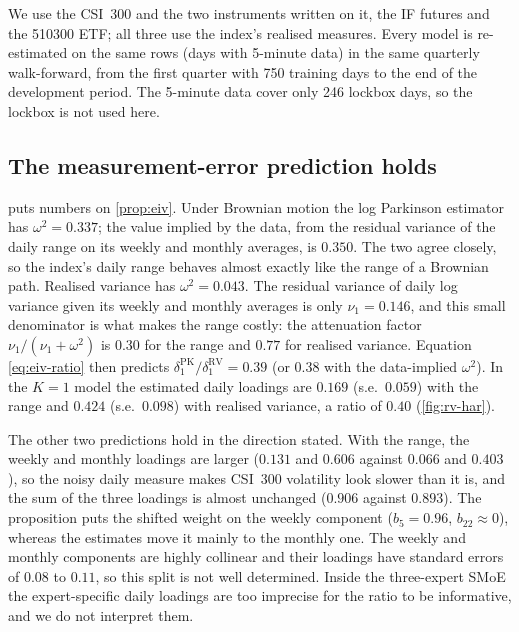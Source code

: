 We use the CSI~300 and the two instruments written on it, the IF futures and the 510300 ETF; all
three use the index's realised measures. Every model is re-estimated on the same rows (days with
5-minute data) in the same quarterly walk-forward, from the first quarter with 750 training days to
the end of the development period. The 5-minute data cover only 246 lockbox days, so the lockbox is
not used here.

\subsection{The measurement-error prediction holds}

 puts numbers on \cref{prop:eiv}. Under Brownian motion the log Parkinson
estimator has $\omega^2=0.337$; the value implied by the data, from the residual variance of the daily
range on its weekly and monthly averages, is $0.350$. The two agree closely, so the index's daily
range behaves almost exactly like the range of a Brownian path. Realised variance has
$\omega^2=0.043$. The residual variance of daily log variance given its weekly and monthly averages
is only $\nu_1=0.146$, and this small denominator is what makes the range costly: the attenuation
factor $\nu_1/(\nu_1+\omega^2)$ is $0.30$ for the range and $0.77$ for realised variance.
Equation \eqref{eq:eiv-ratio} then predicts $\delta_1^{\mathrm{PK}}/\delta_1^{\mathrm{RV}}=0.39$ (or
$0.38$ with the data-implied $\omega^2$). In the $K=1$ model the estimated daily loadings are $0.169$
(s.e.\ $0.059$) with the range and $0.424$ (s.e.\ $0.098$) with realised variance, a ratio of $0.40$
(\cref{fig:rv-har}).

The other two predictions hold in the direction stated. With the range, the weekly and monthly
loadings are larger ($0.131$ and $0.606$ against $0.066$ and $0.403$), so the noisy daily measure
makes CSI~300 volatility look slower than it is, and the sum of the three loadings is almost
unchanged ($0.906$ against $0.893$). The proposition puts the shifted weight on the weekly component
($b_5=0.96$, $b_{22}\approx0$), whereas the estimates move it mainly to the monthly one. The weekly
and monthly components are highly collinear and their loadings have standard errors of $0.08$ to
$0.11$, so this split is not well determined. Inside the three-expert SMoE the expert-specific daily
loadings are too imprecise for the ratio to be informative, and we do not interpret them.



